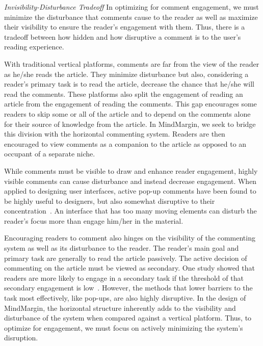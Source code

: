 \textit{Invisibility-Disturbance Tradeoff}
In optimizing for comment engagement, we must minimize the disturbance that comments cause to the reader as well as maximize their visibility to ensure the reader’s engagement with them. Thus, there is a tradeoff between how hidden and how disruptive a comment is to the user’s reading experience. 

With traditional vertical platforms, comments are far from the view of the reader as he/she reads the article. They minimize disturbance but also, considering a reader’s primary task is to read the article, decrease the chance that he/she will read the comments. These platforms also split the engagement of reading an article from the engagement of reading the comments. This gap encourages some readers to skip some or all of the article and to depend on the comments alone for their source of knowledge from the article. In MindMargin, we seek to bridge this division with the horizontal commenting system. Readers are then encouraged to view comments as a companion to the article as opposed to an occupant of a separate niche.

While comments must be visible to draw and enhance reader engagement, highly visible comments can cause disturbance and instead decrease engagement. When applied to designing user interfaces, active pop-up comments have been found to be highly useful to designers, but also somewhat disruptive to their concentration~\cite{CommentingSystems}. An interface that has too many moving elements can disturb the reader's focus more than engage him/her in the material. 

Encouraging readers to comment also hinges on the visibility of the commenting system as well as its disturbance to the reader. The reader’s main goal and primary task are generally to read the article passively. The active decision of commenting on the article must be viewed as secondary. One study showed that readers are more likely to engage in a secondary task if the threshold of that secondary engagement is low~\cite{Wikipedia}. However, the methods that lower barriers to the task most effectively, like pop-ups, are also highly disruptive. In the design of MindMargin, the horizontal structure inherently adds to the visibility and disturbance of the system when compared against a vertical platform. Thus, to optimize for engagement, we must focus on actively minimizing the system’s disruption.